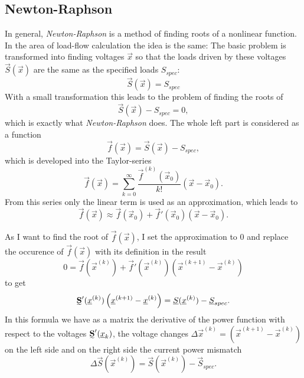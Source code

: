 \subsection{Newton-Raphson}
\label{sec:newton_raphson}

In general, \emph{Newton-Raphson} is a method of finding roots of a nonlinear function. In the area of load-flow calculation the idea is the same: The basic problem is transformed into finding voltages $\vec x$ so that the loads driven by these voltages $\vec S (\vec x)$ are the same as the specified loads $S_{spec}$:
\begin{equation}
	\vec S (\vec x) = S_{spec}
\end{equation}
With a small transformation this leads to the problem of finding the roots of
\begin{equation}
	\vec S (\vec x) - S_{spec} = 0,
\end{equation}
which is exactly what \emph{Newton-Raphson} does. The whole left part is considered as a function
\begin{equation}
	\vec f (\vec x) = \vec S (\vec x) - S_{spec},
\end{equation}
which is developed into the Taylor-series
\begin{equation}
	\vec f (\vec x) = \sum_{k = 0}^\infty \frac{\vec f^{(k)} (\vec x_0)}{k!} \left( \vec x - \vec x_0 \right).
\end{equation}
From this series only the linear term is used as an approximation, which leads to
\begin{equation}
	\vec f (\vec x) \approx \vec f (\vec x_0) + \vec f' (\vec x_0) \left( \vec x - \vec x_0 \right).
\end{equation}

As I want to find the root of $\vec f (\vec x)$, I set the approximation to 0 and replace the occurence of $\vec f (\vec x)$ with its definition in the result
\begin{equation}
	0 = \vec f (\vec x^{(k)}) + \vec f' (\vec x^{(k)}) \left( \vec x^{(k+1)} - \vec x^{(k)} \right)
\end{equation}
to get
\begin{equation}
	\mat S' (\vec x^{(k)}) \left( \vec x^{(k+1)} - \vec x^{(k)} \right) = \vec S (\vec x^{(k)}) - \vec S_{spec}.
	\label{eq:newton_raphson_equation_system}
\end{equation}
In this formula we have as a matrix the derivative of the power function with respect to the voltages $\mat S' (\vec x_k)$, the voltage changes $\Delta \vec x^{(k)} = \left( \vec x^{(k+1)} - \vec x^{(k)} \right)$ on the left side and on the right side the current power mismatch 
\begin{equation}
	\Delta \vec S (\vec x^{(k)}) = \vec S (\vec x^{(k)}) - \vec S_{spec}.
	\label{eq:power_mismatch}
\end{equation}

